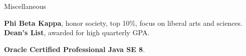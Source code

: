 \begin{rubric}{Miscellaneous}

\entry*[2018] \textbf{Phi Beta Kappa}, honor society, top 10\%, focus on liberal arts and sciences.
\entry*[2016-2018] \textbf{Dean's List}, awarded for high quarterly GPA. %

\entry*[2018] \textbf{Oracle Certified Professional Java SE 8}.

\end{rubric}